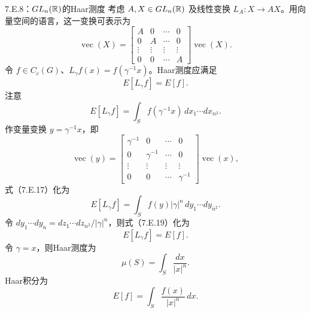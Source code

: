 \begin{bookexample}{7.E.8：\texorpdfstring{$GL_n(\mathbb{R})$}{GLn(R)}的Haar测度}
考虑 $A,X\in GL_n(\mathbb{R})$ 及线性变换 $L_A:X\to AX$。用向量空间的语言，这一变换可表示为
\begin{equation}
\operatorname{vec}(X)=\begin{bmatrix}
A&0&\cdots&0\\
0&A&\cdots&0\\
\vdots&\vdots&\vdots&\vdots\\
0&0&\cdots&A
\end{bmatrix}\operatorname{vec}(X).\tag{7.E.15}
\end{equation}
令 $f\in C_c(G)$、$L_\gamma f(x)=f(\gamma^{-1}x)$。Haar测度应满足
\begin{equation}
E[L_\gamma f]=E[f].\tag{7.E.16}
\end{equation}
注意
\begin{equation}
E[L_\gamma f]=\int_Sf(\gamma^{-1}x)\,dx_1\cdots dx_{n^2}.\tag{7.E.17}
\end{equation}
作变量变换 $y=\gamma^{-1}x$，即
\begin{equation}
\operatorname{vec}(y)=\begin{bmatrix}
\gamma^{-1}&0&\cdots&0\\
0&\gamma^{-1}&\cdots&0\\
\vdots&\vdots&\vdots&\vdots\\
0&0&\cdots&\gamma^{-1}
\end{bmatrix}\operatorname{vec}(x),\tag{7.E.18}
\end{equation}
式（7.E.17）化为
\begin{equation}
E[L_\gamma f]=\int_Sf(y)|\gamma|^n\,dy_1\cdots dy_{n^2}.\tag{7.E.19}
\end{equation}
令 $dy_1\cdots dy_n=dz_1\cdots dz_{n^2}/|\gamma|^n$，则式（7.E.19）化为
\[
E[L_\gamma f]=E[f].
\]
令 $\gamma=x$，则Haar测度为
\begin{equation}
\mu(S)=\int_S\frac{dx}{|x|^n}.\tag{7.E.20}
\end{equation}
Haar积分为
\begin{equation}
E[f]=\int_S\frac{f(x)}{|x|^n}\,dx.\tag{7.E.21}
\end{equation}
\end{bookexample}

